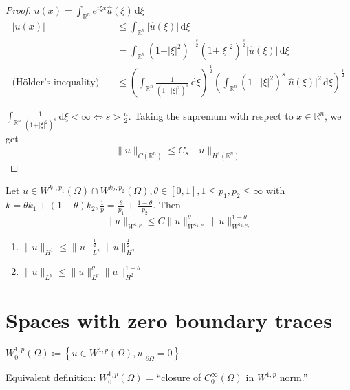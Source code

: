 \documentclass{report}
\begin{document}
\begin{proof}
    \(u(x) = \int_{\mathbb{R}^{n}} e^{i\xi x} \hat{u}(\xi) \,\mathrm{d}\xi \)
    \begin{align*}
        \vert u(x) \vert &\leq \int_{\mathbb{R}^{n}} \vert \hat{u}(\xi) \vert \,\mathrm{d}\xi \\
        &= \int_{\mathbb{R}^{n}} \left(1+\vert \xi \vert ^{2} \right)^{-\frac{s}{2}} \left(1+\vert \xi \vert ^{2} \right)^{\frac{s}{2}} \vert \hat{u}(\xi) \vert \,\mathrm{d}\xi \\
        \text{(Hölder's inequality)} \quad &\leq \left(\int_{\mathbb{R}^{n}} \frac{1}{\left(1+\vert \xi \vert ^{2}  \right)^{s}} \,\mathrm{d}\xi \right)^{\frac{1}{2}} \left(\int_{\mathbb{R}^{n}} \left(1+\vert \xi \vert ^{2} \right)^{s} \vert \hat{u}(\xi) \vert^{2} \,\mathrm{d}\xi \right)^{\frac{1}{2}}
    \end{align*} 

    \(\int_{\mathbb{R}^{n}} \frac{1}{\left(1+\vert \xi \vert ^{2} \right)^{s}} \,\mathrm{d}\xi < \infty \iff s>\frac{n}{2}\).
    Taking the supremum with respect to \(x \in \mathbb{R}^{n}\), we get
    \[\|u\|_{C(\mathbb{R}^{n})} \leq C_{s}\|u\|_{H^{s}(\mathbb{R}^{n})}\]
\end{proof}

{
    Let \(u \in W^{k_1, p_1}(\Omega) \cap W^{k_2, p_2}(\Omega), \theta \in [0,1], 1\leq p_1, p_2 \leq \infty\) with \(k = \theta k_1 + (1-\theta) k_2, \frac{1}{p} = \frac{\theta}{p_1} + \frac{1-\theta}{p_2} \). Then 
    \[
        \|u\|_{W^{k, p}} \leq C\|u\|_{W^{k_1, p_1}}^{\theta} \|u\|_{W^{k_2, p_2}}^{1-\theta}
    \]
}

{
    \begin{enumerate}
        \item \(\|u\|_{H^{1}} \leq \|u\|_{L^{2}}^{\frac{1}{2}} \|u\|_{H^{2}}^{\frac{1}{2}}\)
        \item \(\|u\|_{L^{p}} \leq \|u\|_{L^{p}}^{\theta} \|u\|_{H^{2}}^{1-\theta}\) 
    \end{enumerate}
}

\section{Spaces with zero boundary traces}
\dfn{}
{
    \(W^{1, p}_{0}(\Omega) \coloneqq \left\{u \in W^{1, p}(\Omega), \left. u \right|_{\partial \Omega} = 0\right\} \)

    Equivalent definition: \(W^{1, p}_{0}(\Omega)\) = ``closure of \(C_{0}^{\infty}(\Omega)\) in \(W^{1, p}\) norm.''
}
\end{document}
